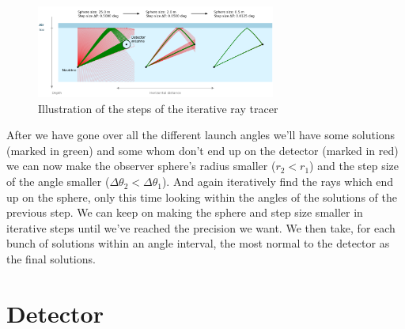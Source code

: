 \documentclass[11pt,a4paper,faculty=we,language=en,doctype=report]{cls/ugent-doc}
\begin{document}
\begin{figure}
  \centering
  \includegraphics[width=0.7\textwidth]{IterativeWorkings.png}
  \caption{Illustration of the steps of the iterative ray tracer}
  \label{fig:IterativeWorkings}
\end{figure}
After we have gone over all the different launch angles we'll have some
solutions (marked in green) and some whom don't end up on the detector (marked
in red) we can now make the observer sphere's radius smaller ($r_2 < r_1$) and
the step size of the angle smaller ($\Delta \theta_2 < \Delta \theta_1$).  And
again iteratively find the rays which end up on the sphere, only this time
looking within the angles of the solutions of the previous step. We can keep on
making the sphere and step size smaller in iterative steps until we've reached
the precision we want. We then take, for each bunch of solutions within an
angle interval, the most normal to the detector as the final solutions.

\chapter{Detector}
\end{document}
